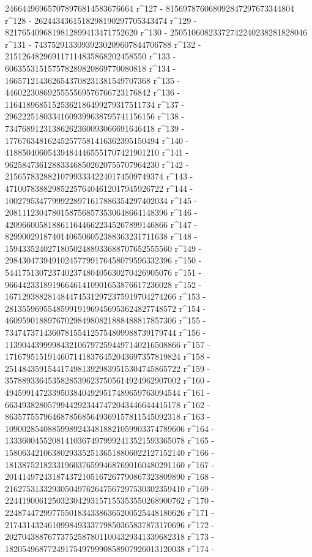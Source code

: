        246644969657078976814583676664 r^127 - 
       815697876068092847297673344804 r^128 - 
       2624434361518298190297705343474 r^129 - 
       8217654096819812899413471752620 r^130 - 
       25051060823372742240238281828046 r^131 - 
       74375291330939230209607844706788 r^132 - 
       215126482969117114835868202458550 r^133 - 
       606355315157578289820869770080818 r^134 - 
       1665712143626543708231381549707368 r^135 - 
       4460223086925555569576766723176842 r^136 - 
       11641896851525362186499279317511734 r^137 - 
       29622251803341609399638795741156156 r^138 - 
       73476891231386262360093066691646418 r^139 - 
       177676348162452577581416362395150494 r^140 - 
       418850406054394844465551707421901210 r^141 - 
       962584736128833468502620755707964230 r^142 - 
       2156578328821079933342240174509749374 r^143 - 
       4710078388298522576404612017945926722 r^144 - 
       10027953477999228971617886354297402034 r^145 - 
       20811123047801587568573530648664148396 r^146 - 
       42096600581886116446622345267899146866 r^147 - 
       82990029187401406506052388363231711638 r^148 - 
       159433524027180502488933688707652555560 r^149 - 
       298430473949102457799176458079596332396 r^150 - 
       544175130723740237480405630270426905076 r^151 - 
       966442331891966461410901653876617236028 r^152 - 
       1671293882814844745312972375919704274266 r^153 - 
       2813559695548599191969456953624827748572 r^154 - 
       4609590188976702984980821888488817857306 r^155 - 
       7347473714360781554125754809988739179744 r^156 - 
       11390443999984321067972594497140216508866 r^157 - 
       17167951519146071418376452043697357819824 r^158 - 
       25148435915441749813929839515304745865722 r^159 - 
       35788933645358285396237505614924962907002 r^160 - 
       49459914723395038404929517489659763094544 r^161 - 
       66349382805799442923447472043446644415178 r^162 - 
       86357755796468785685649369157811545092318 r^163 - 
       109002854088599892434818821059903374789606 r^164 - 
       133360045520814103674979992413521593365078 r^165 - 
       158063421063802933525136518806022127152140 r^166 - 
       181387521823319603765994687690160480291160 r^167 - 
       201414972431874372105167267790867323809890 r^168 - 
       216275313329305049762647567297530302359410 r^169 - 
       224419006125032304293157155353550268900762 r^170 - 
       224874472997755018343386365200525448180626 r^171 - 
       217431432461099849333779850365837873170696 r^172 - 
       202704388767737525878011004329341339682318 r^173 - 
       182054968772491754979990858907926013120038 r^174 - 
